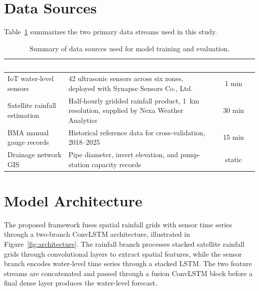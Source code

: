 \documentclass[12pt,a4paper]{report}
\begin{document}
\section{Data Sources}
Table~\ref{tab:sensors} summarizes the two primary data streams used in this study.

\begin{table}[htbp]
\centering
\caption{Summary of data sources used for model training and evaluation.}
\label{tab:sensors}
\renewcommand{\arraystretch}{1.3}
\begin{tabularx}{\textwidth}{@{}l X c@{}}
\toprule
\rowcolor{chulapink}
\textcolor{white}{\textbf{Source}} & \textcolor{white}{\textbf{Description}} & \textcolor{white}{\textbf{Frequency}} \\
\midrule
IoT water-level sensors & 42 ultrasonic sensors across six zones, deployed with Synapse Sensors Co., Ltd. & 1 min \\
Satellite rainfall estimation & Half-hourly gridded rainfall product, 1~km resolution, supplied by Nexa Weather Analytics & 30 min \\
BMA manual gauge records & Historical reference data for cross-validation, 2018--2025 & 15 min \\
Drainage network GIS & Pipe diameter, invert elevation, and pump-station capacity records & static \\
\bottomrule
\end{tabularx}
\end{table}

\section{Model Architecture}
The proposed framework fuses spatial rainfall grids with sensor time series through a two-branch ConvLSTM architecture, illustrated in Figure~\ref{fig:architecture}. The rainfall branch processes stacked satellite rainfall grids through convolutional layers to extract spatial features, while the sensor branch encodes water-level time series through a stacked LSTM. The two feature streams are concatenated and passed through a fusion ConvLSTM block before a final dense layer produces the water-level forecast.
\end{document}

